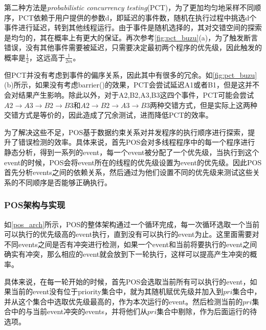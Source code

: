 第二种方法是\textit{probabilistic concurrency testing}(PCT)，为了更加均匀地采样不同顺序，PCT依赖于用户提供的参数d，即延迟的事件数，随机在执行过程中挑选d个事件进行延迟，转到其他线程运行。由于事件是随机选择的，其对交错空间的探索是均匀的，其在概率上有更大的保证。再次参考\autoref{fig:pct_buzu}(a)，为了触发断言错误，没有其他事件需要被延迟，只需要决定最初两个程序的优先级，因此触发的概率是$\frac{1}{2}$，这远高于$\frac{1}{2m}$。

但PCT并没有考虑到事件的偏序关系，因此其中有很多的冗余。如\autoref{fig:pct_buzu}(b)所示，如果没有考虑barrier()的效果，PCT会尝试延迟A1或者B1，但是这并不会对结果产生影响。除此以外，对于A2,B2,A3,B3这四个事件，PCT可能会尝试$A2 \rightarrow A3 \rightarrow B2 \rightarrow B3$和$A2 \rightarrow B2 \rightarrow A3 \rightarrow B3$两种交错方式，但是实际上这两种交错方式是等价的，因此造成了冗余测试，进而降低PCT的效率。

为了解决这些不足，POS基于数据约束关系对并发程序的执行顺序进行探索，提升了错误检测的效率。具体来说，首先POS会对多线程程序中的每一个程序进行静态分析，得到一系列的event，每一个event被分配了一个优先级，当执行到这个event的时候，POS会将event所在的线程的优先级设置为event的优先级。因此POS首先分析events之间的依赖关系，然后通过为他们设置不同的优先级来测试这些关系的不同顺序是否能够正确执行。

\subsubsection{POS架构与实现}

如\autoref{pos_arch}所示，POS的整体架构通过一个循环完成，每一次循环选取一个当前可以执行的优先级高的event执行，直到没有可以执行的event为止。这里面需要对不同events之间是否有冲突进行检测，如果一个event和当前将要执行的event之间确实有冲突，那么相应的event就会放到下一轮执行，这样可以提高产生冲突的概率。

具体来说，在每一轮开始的时候，首先POS会选取当前所有可以执行的event，如果当前的event没有位于priority集合中，就为其随机赋优先级并加入到$pri$集合中，并从这个集合中选取优先级最高的，作为本次运行的event。然后检测当前的$pri$集合中的与当前event冲突的events，并将他们从$pri$集合中剔除，作为后面运行的待选项。

